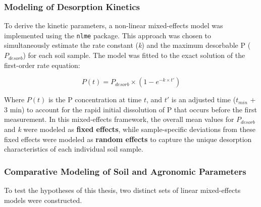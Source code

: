 \documentclass[
  a4paper,
]{article}
\begin{document}
\subsubsection{Modeling of Desorption
Kinetics}\label{sec-modeling-of-desorption-kinetics}

To derive the kinetic parameters, a non-linear mixed-effects model was
implemented using the \texttt{nlme} package. This approach was chosen to
simultaneously estimate the rate constant (\emph{k}) and the maximum
desorbable P (\(P_{desorb}\)) for each soil sample. The model was fitted
to the exact solution of the first-order rate equation:

\[P(t) = P_{desorb} \times (1 - e^{-k \times t'})\]

Where \(P(t)\) is the P concentration at time \(t\), and \(t'\) is an
adjusted time (\(t_{min}\) + 3 min) to account for the rapid initial
dissolution of P that occurs before the first measurement. In this
mixed-effects framework, the overall mean values for \(P_{desorb}\) and
\emph{k} were modeled as \textbf{fixed effects}, while sample-specific
deviations from these fixed effects were modeled as \textbf{random
effects} to capture the unique desorption characteristics of each
individual soil sample.

\subsubsection{Comparative Modeling of Soil and Agronomic
Parameters}\label{comparative-modeling-of-soil-and-agronomic-parameters}

To test the hypotheses of this thesis, two distinct sets of linear
mixed-effects models were constructed.
\end{document}
